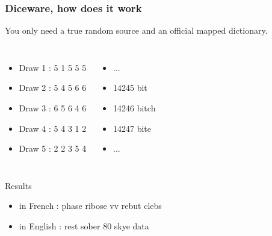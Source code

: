 \begin{frame}
\frametitle{Diceware, how does it work}
You only need a true random source and an official mapped dictionary. \\
\begin{columns}[c]
\begin{itemize}
\item Draw 1 : 5 1 5 5 5
\item Draw 2 : 5 4 5 6 6
\item Draw 3 : 6 5 6 4 6
\item Draw 4 : 5 4 3 1 2
\item Draw 5 : 2 2 3 5 4
\end{itemize}
\begin{itemize}
\item ...
\item 14245 bit
\item 14246 bitch
\item 14247 bite
\item ...
\end{itemize}
\end{columns}
\begin{block}{Results}
\begin{itemize}
\item in French : phase ribose vv rebut clebs
\item in English : rest sober 80 skye data
\end{itemize}
\end{block}
\end{frame}
